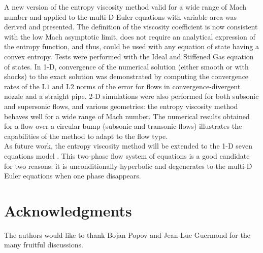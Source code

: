 \documentclass[preprint,10pt]{elsarticle}
\begin{document}
A new version of the entropy viscosity method valid for a wide range of Mach number and applied to the multi-D Euler equations with variable area was derived and presented. The definition of the viscosity coefficient is now consistent with the low Mach asymptotic limit, does not require an analytical expression of the entropy function, and thus, could be used with any equation of state having a convex entropy. Tests were performed with the Ideal and Stiffened Gas equation of states. In 1-D, convergence of the numerical solution (either smooth or with shocks) to the exact solution was demonstrated by computing the convergence rates of the L$1$ and L$2$ norms of the error for flows in convergence-divergent nozzle and a straight pipe. 2-D simulations were also performed for both subsonic and supersonic flows, and various geometries: the entropy viscosity method behaves well for a wide range of Mach number. The numerical results obtained for a flow over a circular bump (subsonic and transonic flows) illustrates the capabilities of the method to adapt to the flow type. \\
As future work, the entropy viscosity method will be extended to the 1-D seven equations model \cite{SEM}. This two-phase flow system of equations is a good candidate for two reasons: it is unconditionally hyperbolic and degenerates to the multi-D Euler equations when one phase disappears.

\section*{Acknowledgments} 
The authors would like to thank Bojan Popov and Jean-Luc Guermond for the many fruitful discussions.  

\newpage
\appendix
\end{document}
